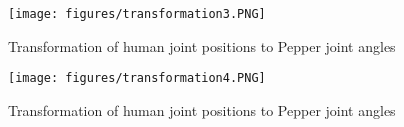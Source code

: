 \begin{figure}[t!]
	\begin{center}
		\texttt{[image: figures/transformation3.PNG]}
	\end{center}
	\caption{Transformation of human joint positions to Pepper joint angles}
	\label{transformation3}
\end{figure}

\begin{figure}[t!]
	\begin{center}
		\texttt{[image: figures/transformation4.PNG]}
	\end{center}
	\caption{Transformation of human joint positions to Pepper joint angles}
	\label{transformation4}
\end{figure}